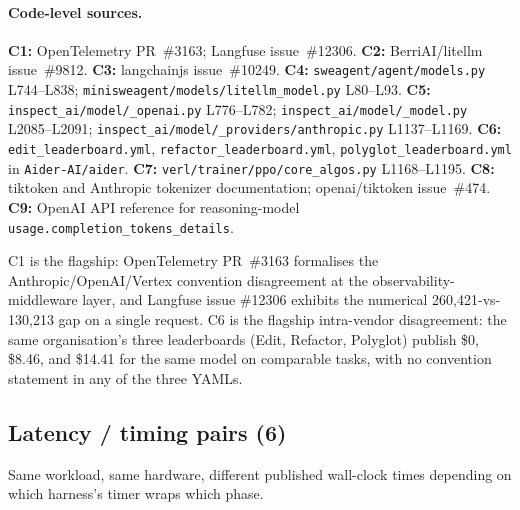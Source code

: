 \documentclass{article}
\begin{document}
\paragraph{Code-level sources.}
{\footnotesize\raggedright
\textbf{C1:} OpenTelemetry PR~\#3163; Langfuse issue~\#12306.
\textbf{C2:} BerriAI/litellm issue~\#9812.
\textbf{C3:} langchainjs issue~\#10249.
\textbf{C4:} \texttt{sweagent/agent/models.py} L744--L838;
\texttt{minisweagent/models/litellm\_model.py} L80--L93.
\textbf{C5:} \texttt{inspect\_ai/model/\_openai.py} L776--L782;
\texttt{inspect\_ai/model/\_model.py} L2085--L2091;
\texttt{inspect\_ai/model/\_providers/anthropic.py} L1137--L1169.
\textbf{C6:} \texttt{edit\_leaderboard.yml},
\texttt{refactor\_leaderboard.yml},
\texttt{polyglot\_leaderboard.yml} in \texttt{Aider-AI/aider}.
\textbf{C7:} \texttt{verl/trainer/ppo/core\_algos.py} L1168--L1195.
\textbf{C8:} tiktoken and Anthropic tokenizer documentation;
openai/tiktoken issue~\#474.
\textbf{C9:} OpenAI API reference for reasoning-model
\texttt{usage.completion\_tokens\_details}.
\par}

C1 is the flagship: OpenTelemetry PR~\#3163 formalises the
Anthropic/OpenAI/Vertex convention disagreement at the
observability-middleware layer, and Langfuse issue \#12306
exhibits the numerical 260{,}421-vs-130{,}213 gap on a single
request. C6 is the flagship intra-vendor disagreement: the
same organisation's three leaderboards (Edit, Refactor,
Polyglot) publish \$0, \$8.46, and \$14.41 for the same model
on comparable tasks, with no convention statement in any of
the three YAMLs.

\subsection{Latency / timing pairs (6)}
\label{app:vc:latency}

Same workload, same hardware, different published wall-clock
times depending on which harness's timer wraps which phase.
\end{document}
